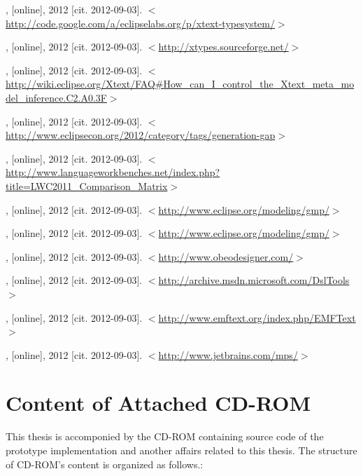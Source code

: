\documentclass[12pt,notitlepage,a4paper]{report}
\begin{document}
\begin{thebibliography}{99}
, [online], 2012 [cit. 2012-09-03]. $<$\url{http://code.google.com/a/eclipselabs.org/p/xtext-typesystem/}$>$

, [online], 2012 [cit. 2012-09-03]. $<$\url{http://xtypes.sourceforge.net/}$>$

, [online], 2012 [cit. 2012-09-03]. $<$\url{http://wiki.eclipse.org/Xtext/FAQ#How_can_I_control_the_Xtext_meta_model_inference.C2.A0.3F}$>$

, [online], 2012 [cit. 2012-09-03]. $<$\url{http://www.eclipsecon.org/2012/category/tags/generation-gap}$>$

, [online], 2012 [cit. 2012-09-03]. $<$\url{http://www.languageworkbenches.net/index.php?title=LWC2011_Comparison_Matrix}$>$

, [online], 2012 [cit. 2012-09-03]. $<$\url{http://www.eclipse.org/modeling/gmp/}$>$ 

, [online], 2012 [cit. 2012-09-03]. $<$\url{http://www.eclipse.org/modeling/gmp/}$>$ 

, [online], 2012 [cit. 2012-09-03]. $<$\url{http://www.obeodesigner.com/}$>$ 

, [online], 2012 [cit. 2012-09-03]. $<$\url{http://archive.msdn.microsoft.com/DslTools}$>$ 

, [online], 2012 [cit. 2012-09-03]. $<$\url{http://www.emftext.org/index.php/EMFText}$>$ 

, [online], 2012 [cit. 2012-09-03]. $<$\url{http://www.jetbrains.com/mps/}$>$ 

\end{thebibliography}

\newpage
\addappheadtotoc
\appendix \chapter{Content of Attached CD-ROM}
This thesis is accomponied by the CD-ROM containing source code of the prototype implementation and another affairs related to this thesis. The structure of CD-ROM's content is organized as follows.: 	
\end{document}
